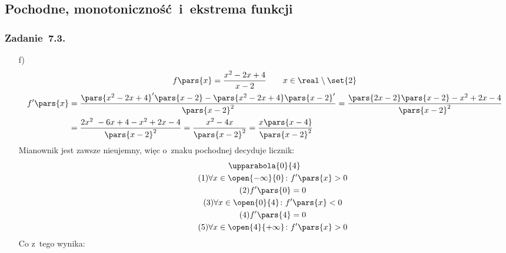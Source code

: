 \subsection*{Pochodne, monotoniczność i~ekstrema funkcji}
\subsubsection*{Zadanie~7.3.}
\begin{itemize}
    \item[f)]
        \begin{gather*}
            f\pars{x} = \frac{x^2 - 2x + 4}{x - 2} \qquad x \in \real \setminus \set{2}\\
            \begin{split}
                f'\pars{x}
                    &= \frac{\pars{x^2 - 2x + 4}'\pars{x - 2} - \pars{x^2 - 2x + 4}\pars{x - 2}'}{\pars{x - 2}^2}
                    = \frac{\pars{2x - 2}\pars{x - 2} - x^2 + 2x - 4}{\pars{x - 2}^2}\\
                    &= \frac{2x^2 - 6x + 4 - x^2 + 2x - 4}{\pars{x - 2}^2}
                    = \frac{x^2 - 4x}{\pars{x - 2}^2}
                    = \frac{x\pars{x - 4}}{\pars{x - 2}^2}
            \end{split}
        \end{gather*}
        Mianownik jest zawsze nieujemny, więc o~znaku pochodnej decyduje licznik:
        \begin{gather*}
            \upparabola{0}{4}\\
            \tag{\(1\)} \forall x \in \open{-\infty}{0}\colon f'\pars{x} > 0 \label{2020_10_21:7_3:f:first_increase}\\
            \tag{\(2\)} f'\pars{0} = 0 \label{2020_10_21:7_3:f:first_zero}\\
            \tag{\(3\)} \forall x \in \open{0}{4}\colon f'\pars{x} < 0 \label{2020_10_21:7_3:f:decrease}\\
            \tag{\(4\)} f'\pars{4} = 0 \label{2020_10_21:7_3:f:second_zero}\\
            \tag{\(5\)} \forall x \in \open{4}{+\infty}\colon f'\pars{x} > 0 \label{2020_10_21:7_3:f:second_increase}
        \end{gather*}
        Co z~tego wynika:
\end{itemize}
